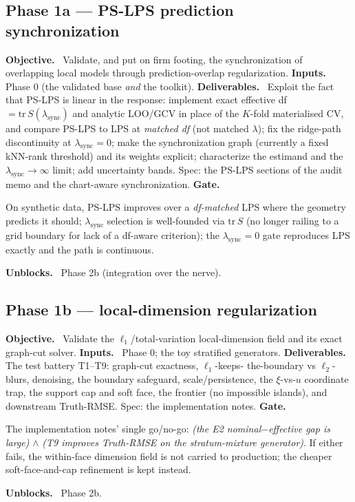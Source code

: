 \documentclass[11pt]{article}
\newcommand{\field}[1]{\smallskip\noindent\textbf{\textsf{#1.}}\ }
\begin{document}
\subsection{Phase 1a --- PS-LPS prediction synchronization}
\field{Objective} Validate, and put on firm footing, the synchronization of
overlapping local models through prediction-overlap regularization.
\field{Inputs} Phase 0 (the validated base \emph{and} the toolkit).
\field{Deliverables} Exploit the fact that PS-LPS is linear in the response:
implement exact effective df $=\mathrm{tr}\,S(\lambda_{\mathrm{sync}})$ and analytic
LOO/GCV in place of the $K$-fold materialised CV, and compare PS-LPS to LPS at
\emph{matched df} (not matched $\lambda$); fix the ridge-path discontinuity at
$\lambda_{\mathrm{sync}}=0$; make the synchronization graph (currently a fixed
kNN-rank threshold) and its weights explicit; characterize the estimand and the
$\lambda_{\mathrm{sync}}\to\infty$ limit; add uncertainty bands. Spec: the PS-LPS
sections of the audit memo and the chart-aware synchronization.
\field{Gate} \begin{gate} On synthetic data, PS-LPS improves over a \emph{df-matched}
LPS where the geometry predicts it should; $\lambda_{\mathrm{sync}}$ selection is
well-founded via $\mathrm{tr}\,S$ (no longer railing to a grid boundary for lack of
a df-aware criterion); the $\lambda_{\mathrm{sync}}=0$ gate reproduces LPS exactly
and the path is continuous.\end{gate}
\field{Unblocks} Phase 2b (integration over the nerve).

\subsection{Phase 1b --- local-dimension regularization}
\field{Objective} Validate the $\ell_1$/total-variation local-dimension field and
its exact graph-cut solver.
\field{Inputs} Phase 0; the toy stratified generators.
\field{Deliverables} The test battery T1--T9: graph-cut exactness, $\ell_1$-keeps-
the-boundary vs $\ell_2$-blurs, denoising, the boundary safeguard, scale/persistence,
the $\xi$-vs-$u$ coordinate trap, the support cap and soft face, the frontier
(no impossible islands), and downstream Truth-RMSE. Spec: the implementation notes.
\field{Gate} \begin{gate} The implementation notes' single go/no-go: \emph{(the E2
nominal$-$effective gap is large)} $\wedge$ \emph{(T9 improves Truth-RMSE on the
stratum-mixture generator)}. If either fails, the within-face dimension field is not
carried to production; the cheaper soft-face-and-cap refinement is kept
instead.\end{gate}
\field{Unblocks} Phase 2b.
\end{document}
